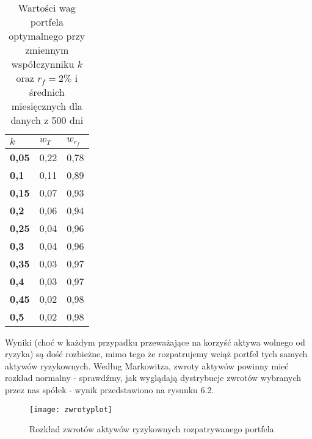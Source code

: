 \documentclass[magister]{dyplom}
\begin{document}
\begin{table}[ht]
	\centering
	\caption{Wartości wag portfela optymalnego przy zmiennym współczynniku $k$ oraz $r_f = 2\%$ i średnich miesięcznych dla danych z 500 dni}
	\begin{tabular}{|l|l|l|}
		\hline
		\textbf{$k$} & \textbf{$w_T$} & \textbf{$w_{r_f}$} \\ \hline
		\textbf{0,05}                                             & 0,22          & 0,78           \\ \hline
		\textbf{0,1}                                              & 0,11          & 0,89           \\ \hline
		\textbf{0,15}                                             & 0,07          & 0,93           \\ \hline
		\textbf{0,2}                                              & 0,06          & 0,94           \\ \hline
		\textbf{0,25}                                             & 0,04          & 0,96           \\ \hline
		\textbf{0,3}                                              & 0,04          & 0,96           \\ \hline
		\textbf{0,35}                                             & 0,03          & 0,97           \\ \hline
		\textbf{0,4}                                              & 0,03          & 0,97           \\ \hline
		\textbf{0,45}                                             & 0,02          & 0,98           \\ \hline
		\textbf{0,5}                                              & 0,02          & 0,98           \\ \hline
	\end{tabular}
\end{table}
\newpage
Wyniki (choć w każdym przypadku przeważające na korzyść aktywa wolnego od ryzyka) są dość rozbieżne, mimo tego że rozpatrujemy wciąż portfel tych samych aktywów ryzykownych. Według Markowitza, zwroty aktywów powinny mieć rozkład normalny - sprawdźmy, jak wyglądają dystrybucje zwrotów wybranych przez nas spółek - wynik przedstawiono na rysunku 6.2.

\begin{figure}[ht]
	\centering
	\texttt{[image: zwrotyplot]}
	\caption{Rozkład zwrotów aktywów ryzykownych rozpatrywanego portfela}
\end{figure}
\end{document}
